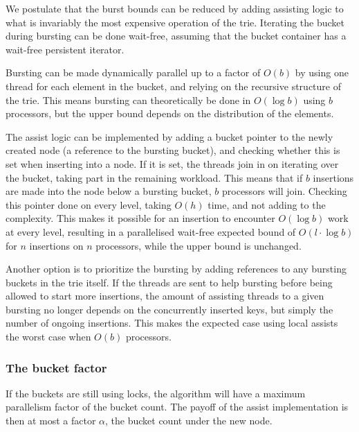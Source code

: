 We postulate that the burst bounds can be reduced by adding assisting logic to
what is invariably the most expensive operation of the trie. Iterating the
bucket during bursting can be done wait-free, assuming that the bucket
container has a wait-free persistent iterator.

Bursting can be made dynamically parallel up to a factor of $O(b)$ by
using one thread for each element in the bucket, and relying on the recursive
structure of the trie. This means bursting can theoretically be done in
$O(\log b)$ using $b$ processors, but the upper bound depends on the
distribution of the elements.

The assist logic can be implemented by adding a bucket pointer to the
newly created node (a reference to the bursting bucket), and checking whether
this is set when inserting into a node. If it is set, the threads join
in on iterating over the bucket, taking part in the remaining workload.
This means that if $b$ insertions are made into the node
below a bursting bucket, $b$ processors will join. Checking this pointer
done on every level, taking $O(h)$ time, and not adding to the complexity.
This makes it possible for an insertion to encounter
$O(\log b)$ work at every level, resulting in a parallelised wait-free
expected bound of $O(l \cdot \log b)$ for $n$ insertions on $n$ processors,
while the upper bound is unchanged.

Another option is to prioritize the bursting by adding references to any
bursting buckets in the trie itself. If the threads are sent to help bursting
before being allowed to start more insertions, the amount of assisting threads
to a given bursting no longer depends on the concurrently inserted keys,
but simply the number of ongoing insertions. This makes the expected case
using local assists the worst case when $O(b)$ processors.

\subsubsection{The bucket factor}
If the buckets are still using locks, the algorithm will have a maximum
parallelism factor of the bucket count. The payoff of the assist implementation
is then at most a factor $\alpha$, the bucket count under the new node.

